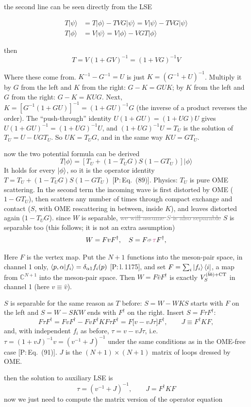 \documentclass[11pt]{article}
\newcommand{\tagP}[1]{\textcolor{blue!65!black}{\textsf{\small[P:\,#1]}}}
\newcommand{\ai}[1]{\textcolor{aicolor}{#1}}
\newcommand{\aifix}[2]{\textcolor{gray}{\sout{#1}} \textcolor{aicolor}{#2}}
\newcommand{\aifixm}[2]{\textcolor{gray}{\text{\sout{$#1$}}}\,\textcolor{aicolor}{#2}}
\newcommand{\ai}[1]{#1}
\newcommand{\aifix}[2]{#2}
\newcommand{\aifixm}[2]{#2}
\newenvironment{aiadd}{\par}{\par}
\begin{document}
the second line can be seen directly from the LSE

\begin{align}
	T\lvert \psi \rangle & = T\lvert \phi \rangle - TVG\lvert \psi \rangle = V\lvert \psi \rangle - TVG\lvert \psi \rangle \\
	T\lvert \phi \rangle & = V\lvert \psi \rangle = V\lvert \phi \rangle - VGT\lvert \phi \rangle
\end{align}

then
\[
	T = V(1 + GV)^{-1}=(1 + VG)^{-1}V
\]



\begin{aiadd}
	Where these come from. $K^{-1}-G^{-1}=U$ is just $K=(G^{-1}+U)^{-1}$. Multiply it by $G$ from the left and $K$ from the right: $G-K=GUK$; by $K$ from the left and $G$ from the right: $G-K=KUG$. Next, $K=[G^{-1}(1+GU)]^{-1}=(1+GU)^{-1}G$ (the inverse of a product reverses the order). The ``push-through'' identity $U(1+GU)=(1+UG)U$ gives $U(1+GU)^{-1}=(1+UG)^{-1}U$, and $(1+UG)^{-1}U=T_U$ is the solution of $T_U=U-UGT_U$. So $UK=T_UG$, and in the same way $KU=GT_U$.
\end{aiadd}

now the two potential formula can be derived
\[
	T\lvert \phi \rangle = \left[T_U + (1 - T_UG)S(1-GT_U)\right]\lvert \phi \rangle
\]
\ai{It holds for every $\ket\phi$, so it is the operator identity $T=T_U+(1-T_UG)S(1-GT_U)$ \tagP{Eq.~(89)}. Physics: $T_U$ is pure OME scattering. In the second term the incoming wave is first distorted by OME ($1-GT_U$), then scatters any number of times through compact exchange and contact ($S$, with OME rescattering in between, inside $K$), and leaves distorted again ($1-T_UG$).}
since $W$ is separable, \aifix{we will assume $S$ is also separable}{$S$ is separable too (this follows; it is not an extra assumption)}
\[
	W = Fv F^\dagger,\quad S = F\aifixm{\sigma}{\tau} F^\dagger,
\]
\begin{aiadd}
	Here $F$ is the vertex map. Put the $N+1$ functions into the meson-pair space, in channel 1 only, $\braket{p,\alpha|f_i}=\delta_{\alpha1}f_i(p)$ \tagP{l.\,1175}, and set $F=\sum_i\ket{f_i}\bra i$, a map from $\mathbb C^{N+1}$ into the meson-pair space. Then $W=F\hat vF^\dagger$ is exactly $V^{(\bar bb)+{\rm CT}}_S$ in channel 1 (here $v\equiv\hat v$).

	$S$ is separable for the same reason as $T$ before: $S=W-WKS$ starts with $F$ on the left and $S=W-SKW$ ends with $F^\dagger$ on the right. Insert $S=F\tau F^\dagger$:
	\[
		F\tau F^\dagger=FvF^\dagger-FvF^\dagger KF\tau F^\dagger=F\big[v-vJ\tau\big]F^\dagger,\qquad J\equiv F^\dagger KF,
	\]
	and, with independent $f_i$ as before, $\tau=v-vJ\tau$, i.e.\ $\tau=(1+vJ)^{-1}v=(v^{-1}+J)^{-1}$ under the same conditions as in the OME-free case \tagP{Eq.~(91)}. $J$ is the $(N+1)\times(N+1)$ matrix of loops dressed by OME.
\end{aiadd}
then the solution to auxiliary LSE is
\[
	\tau = (v^{-1} + J)^{-1},\qquad J = F^\dagger K F
\]
now we just need to compute the matrix version of the operator equation
\end{document}
